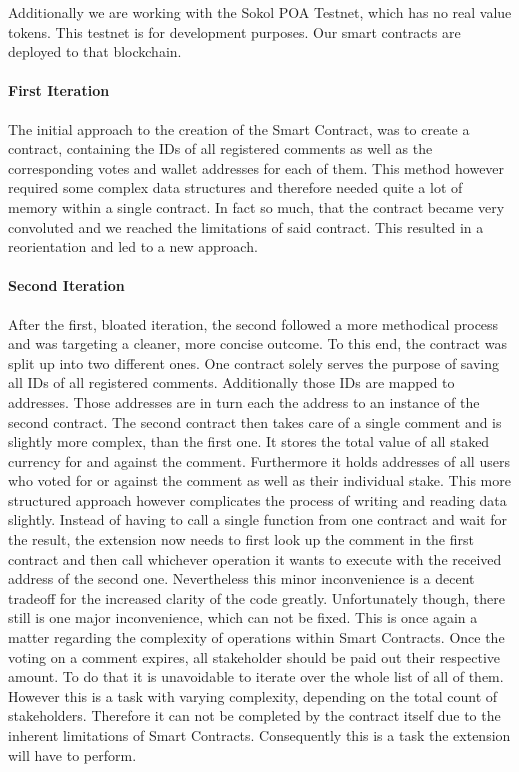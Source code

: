 \documentclass[sigconf]{acmart}
\begin{document}
Additionally we are working with the Sokol POA Testnet, which has no real value tokens. This testnet is for development purposes. Our smart contracts are deployed to that blockchain. \cite{sokolTestnet}

\paragraph*{First Iteration}

The initial approach to the creation of the Smart Contract, was to create a contract, containing the IDs of all registered comments as well as the corresponding votes and wallet addresses for each of them. This method however required some complex data structures and therefore needed quite a lot of memory within a single contract. In fact so much, that the contract became very convoluted and we reached the limitations of said contract. This resulted in a reorientation and led to a new approach.

\paragraph*{Second Iteration}

After the first, bloated iteration, the second followed a more methodical process and was targeting a cleaner, more concise outcome. To this end, the contract was split up into two different ones. One contract solely serves the purpose of saving all IDs of all registered comments. Additionally those IDs are mapped to addresses. Those addresses are in turn each the address to an instance of the second contract. The second contract then takes care of a single comment and is slightly more complex, than the first one. It stores the total value of all staked currency for and against the comment. Furthermore it holds addresses of all users who voted for or against the comment as well as their individual stake.
This more structured approach however complicates the process of writing and reading data slightly. Instead of having to call a single function from one contract and wait for the result, the extension now needs to first look up the comment in the first contract and then call whichever operation it wants to execute with the received address of the second one.
Nevertheless this minor inconvenience is a decent tradeoff for the increased clarity of the code greatly. Unfortunately though, there still is one major inconvenience, which can not be fixed. This is once again a matter regarding the complexity of operations within Smart Contracts. Once the voting on a comment expires, all stakeholder should be paid out their respective amount. To do that it is unavoidable to iterate over the whole list of all of them. However this is a task with varying complexity, depending on the total count of stakeholders. Therefore it can not be completed by the contract itself due to the inherent limitations of Smart Contracts. Consequently this is a task the extension will have to perform.
\end{document}
